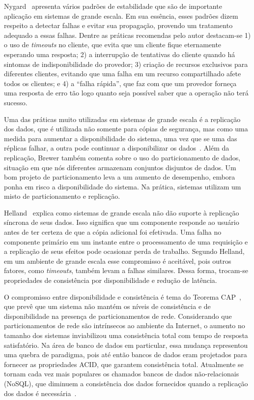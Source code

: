 Nygard~\cite{Nygard2009Release} apresenta vários padrões de estabilidade que são de importante aplicação em sistemas de grande escala. Em sua essência, esses padrões dizem respeito a detectar falhas e evitar sua propagação, provendo um tratamento adequado a essas falhas. Dentre as práticas recomendas pelo autor destacam-se 1) o uso de \emph{timeouts} no cliente, que evita que um cliente fique eternamente esperando uma resposta; 2) a interrupção de tentativas do cliente quando há sintomas de indisponibilidade do provedor; 3) criação de recursos exclusivos para diferentes clientes, evitando que uma falha em um recurso compartilhado afete todos os clientes; e 4) a ``falha rápida'', que faz com que um provedor forneça uma resposta de erro tão logo quanto seja possível saber que a operação não terá sucesso.

Uma das práticas muito utilizadas em sistemas de grande escala é a replicação dos dados, que é utilizada não somente para cópias de segurança, mas como uma medida para aumentar a disponibilidade do sistema, uma vez que se uma das réplicas falhar, a outra pode continuar a disponibilizar os dados~\cite{Brewer2001GiantScale}. Além da replicação, Brewer também comenta sobre o uso do particionamento de dados, situação em que nós diferentes armazenam conjuntos disjuntos de dados. Um bom projeto de particionamento leva a um aumento de desempenho, embora ponha em risco a disponibilidade do sistema. Na prática, sistemas utilizam um misto de particionamento e replicação.

Helland~\cite{Helland2009Quicksand} explica como sistemas de grande escala não dão suporte à replicação síncrona de seus dados. Isso significa que um componente responde ao usuário antes de ter certeza de que a cópia adicional foi efetivada. Uma falha no componente primário em um instante entre o processamento de uma requisição e a replicação de seus efeitos pode ocasionar perda de trabalho. Segundo Helland, em um ambiente de grande escala esse compromisso é aceitável, pois outros fatores, como \emph{timeouts}, também levam a falhas similares. Dessa forma, trocam-se propriedades de consistência por disponibilidade e redução de latência.

O compromisso entre disponibilidade e consistência é tema do Teorema CAP~\cite{Brewer2012Cap}, que prevê que um sistema não mantém os níveis de consistência e de disponibilidade na presença de particionamentos de rede. Considerando que particionamentos de rede são intrínsecos ao ambiente da Internet, o aumento no tamanho dos sistemas inviabilizou uma consistência total com tempo de resposta satisfatório.  Na área de banco de dados em particular, essa mudança representou uma quebra de paradigma, pois até então bancos de dados eram projetados para fornecer as propriedades ACID, que garantem consistência total. Atualmente se tornam cada vez mais populares os chamados bancos de dados não-relacionais (NoSQL), que diminuem a consistência dos dados fornecidos quando a replicação dos dados é necessária~\cite{REF_NEEDED}. 


